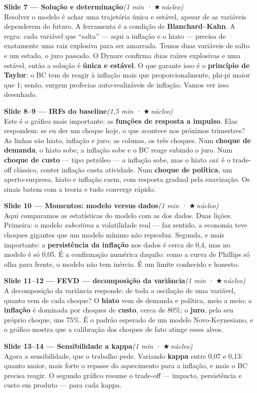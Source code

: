 \documentclass[11pt,a4paper]{article}
\newcommand{\slide}[3]{\medskip\noindent{\color{azul}\rule{3pt}{14pt}}\;
  \textbf{Slide #1 --- #2}\hfill\textit{(#3)}\\[1mm]}
\newcommand{\nucleo}{{\color{verdee}\footnotesize$\bigstar$\,núcleo}}
\begin{document}
\slide{7}{Solução e determinação}{1 min · \nucleo}
Resolver o modelo é achar uma trajetória única e estável, apesar de as variáveis dependerem do futuro.
A ferramenta é a condição de \textbf{Blanchard--Kahn}. A regra: cada variável que ``salta'' --- aqui a
inflação e o hiato --- precisa de exatamente uma raiz explosiva para ser amarrada. Temos duas variáveis
de salto e um estado, o juro passado. O Dynare confirma duas raízes explosivas e uma estável, então a
solução é \textbf{única e estável}. O que garante isso é o \textbf{princípio de Taylor}: o BC tem de
reagir à inflação mais que proporcionalmente, phi-pi maior que 1; senão, surgem profecias
auto-realizáveis de inflação. Vamos ver isso desenhado.

\slide{8--9}{IRFs do baseline}{1,5 min · \nucleo}
Este é o gráfico mais importante: as \textbf{funções de resposta a impulso}. Elas respondem: se eu der
um choque hoje, o que acontece nos próximos trimestres? As linhas são hiato, inflação e juro; as
colunas, os três choques. Num \textbf{choque de demanda}, o hiato sobe, a inflação sobe e o BC reage
subindo o juro. Num \textbf{choque de custo} --- tipo petróleo --- a inflação sobe, mas o hiato
\emph{cai}: é o trade-off clássico, conter inflação custa atividade. Num \textbf{choque de política},
um aperto-surpresa, hiato e inflação caem, com resposta gradual pela suavização. Os sinais batem com a
teoria e tudo converge rápido.

\slide{10}{Momentos: modelo versus dados}{1 min · \nucleo}
Aqui comparamos as estatísticas do modelo com as dos dados. Duas lições. Primeira: o modelo
\emph{subestima} a volatilidade real --- faz sentido, a economia teve choques gigantes que um modelo
mínimo não reproduz. Segunda, e mais importante: a \textbf{persistência da inflação} nos dados é cerca
de 0,4, mas no modelo é só 0,05. É a confirmação numérica daquilo: como a curva de Phillips só olha
para frente, o modelo não tem inércia. É um limite conhecido e honesto.

\slide{11--12}{FEVD --- decomposição da variância}{1 min · \nucleo}
A decomposição da variância responde: de toda a oscilação de uma variável, quanto vem de cada choque? O
\textbf{hiato} vem de demanda e política, meio a meio; a \textbf{inflação} é dominada por choques de
\textbf{custo}, cerca de 80\%; o \textbf{juro}, pelo seu próprio choque, uns 75\%. É o padrão esperado
de um modelo Novo-Keynesiano, e o gráfico mostra que a calibração dos choques de fato atinge esses
alvos.

\slide{13--14}{Sensibilidade a kappa}{1 min · \nucleo}
Agora a sensibilidade, que o trabalho pede. Variando \textbf{kappa} entre 0,07 e 0,13: quanto maior,
mais forte o repasse do aquecimento para a inflação, e mais o BC precisa reagir. O segundo gráfico
resume o trade-off --- impacto, persistência e custo em produto --- para cada kappa.
\end{document}

